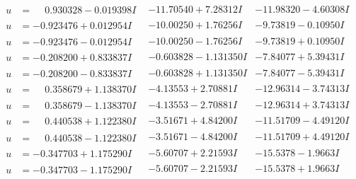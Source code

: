 \documentclass[1p]{elsarticle_modified}
\theoremstyle{definition}
\begin{document}
$$\begin{array}{c|c|c}
\begin{aligned}
u &= \phantom{-}0.930328 - 0.019398 I\end{aligned}
 & -11.70540 + 7.28312 I & -11.98320 - 4.60308 I \\ \hline\begin{aligned}
u &= -0.923476 + 0.012954 I\end{aligned}
 & -10.00250 + 1.76256 I & -9.73819 - 0.10950 I \\ \hline\begin{aligned}
u &= -0.923476 - 0.012954 I\end{aligned}
 & -10.00250 - 1.76256 I & -9.73819 + 0.10950 I \\ \hline\begin{aligned}
u &= -0.208200 + 0.833837 I\end{aligned}
 & -0.603828 - 1.131350 I & -7.84077 + 5.39431 I \\ \hline\begin{aligned}
u &= -0.208200 - 0.833837 I\end{aligned}
 & -0.603828 + 1.131350 I & -7.84077 - 5.39431 I \\ \hline\begin{aligned}
u &= \phantom{-}0.358679 + 1.138370 I\end{aligned}
 & -4.13553 + 2.70881 I & -12.96314 - 3.74313 I \\ \hline\begin{aligned}
u &= \phantom{-}0.358679 - 1.138370 I\end{aligned}
 & -4.13553 - 2.70881 I & -12.96314 + 3.74313 I \\ \hline\begin{aligned}
u &= \phantom{-}0.440538 + 1.122380 I\end{aligned}
 & -3.51671 + 4.84200 I & -11.51709 - 4.49120 I \\ \hline\begin{aligned}
u &= \phantom{-}0.440538 - 1.122380 I\end{aligned}
 & -3.51671 - 4.84200 I & -11.51709 + 4.49120 I \\ \hline\begin{aligned}
u &= -0.347703 + 1.175290 I\end{aligned}
 & -5.60707 + 2.21593 I & -15.5378 - 1.9663 I \\ \hline\begin{aligned}
u &= -0.347703 - 1.175290 I\end{aligned}
 & -5.60707 - 2.21593 I & -15.5378 + 1.9663 I \\ \hline\begin{aligned}

\end{aligned}
\end{array}$$
\end{document}
